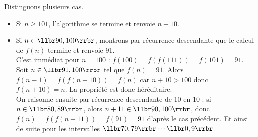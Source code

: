 \begin{multicols}{2}
\ifprof
\begin{corrige}

Distinguons plusieurs cas.

\begin{itemize}
\item Si $n\geq 101$, l'algorithme se termine et renvoie $n-10$. 
\item Si $n\in\llbr90, 100\rrbr$, montrons par récurrence descendante que le calcul de $f(n)$ termine et renvoie 
91.\\
C'est immédiat pour $n=100$ : $f(100)=f(f(111))=f(101)=91$.\\
Soit $n\in\llbr91,100\rrbr$ tel que $f(n)=91$. Alors $f(n-1)=f(f(n+10))=f(n)$ car $n+10>100$ donc $f(n+10)=n$. La 
propriété est 
donc héréditaire.\\
On raisonne ensuite par récurrence descendante de 10 en 10 : si $n\in\llbr80,89\rrbr$, alors $n+11\in\llbr90,100\rrbr$, 
donc $f(n)=f(f(n+11))=f(91)=91$ d'après le cas précédent. Et ainsi de suite pour les intervalles 
$\llbr70,79\rrbr\cdots\llbr0,9\rrbr$.
\end{itemize}
\end{corrige}


\else
\fi





\ifprof
\else
\end{multicols}
\fi

